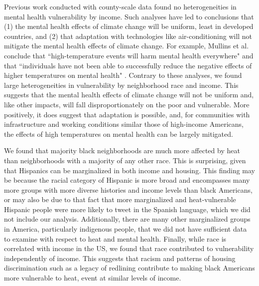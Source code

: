 \documentclass[fleqn,10pt]{wlscirep}
\begin{document}
Previous work conducted with county-scale data found no heterogeneities in mental health vulnerability by income.  Such analyses have led to conclusions that (1) the mental health effects of climate change will be uniform, least in developed countries, and (2) that adaptation with technologies like air-conditioning will not mitigate the mental health effects of climate change.  For example, Mullins et al. conclude that ``high-temperature events will harm mental health everywhere" and that ``individuals have not been able to successfully reduce the negative effects of higher temperatures on mental health" \cite{Mullins2019Dec}.  Contrary to these analyses, we found large heterogeneities in vulnerability by neighborhood race and income.  This suggests that the mental health effects of climate change will not be uniform and, like other impacts, will fall disproportionately on the poor and vulnerable.  More positively, it does suggest that adaptation is possible, and, for communities with infrastructure and working conditions similar those of high-income Americans, the effects of high temperatures on mental health can be largely mitigated.

We found that majority black neighborhoods are much more affected by heat than neighborhoods with a majority of any other race.  This is surprising, given that Hispanics can be marginalized in both income and housing.  This finding may be because the racial category of Hispanic is more broad and encompasses many more groups with more diverse histories and income levels than black Americans, or may also be due to that fact that more marginalized and heat-vulnerable Hispanic people were more likely to tweet in the Spanish language, which we did not include our analysis.  Additionally, there are many other marginalized groups in America, particularly indigenous people, that we did not have sufficient data to examine with respect to heat and mental health.  Finally, while race is correlated with income in the US, we found that race contributed to vulnerability independently of income.  This suggests that racism and patterns of housing discrimination such as a legacy of redlining contribute to making black Americans more vulnerable to heat, event at similar levels of income.
\end{document}
